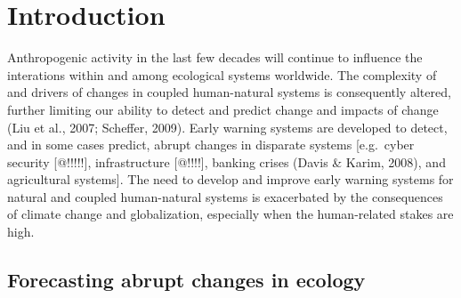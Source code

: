 \documentclass[12pt,twoside,openany]{reedthesis}
\begin{document}
\endgroup{}

\hypertarget{intro}{%
\chapter{Introduction}\label{intro}}

Anthropogenic activity in the last few decades will continue to influence the interations within and among ecological systems worldwide. The complexity of and drivers of changes in coupled human-natural systems is consequently altered, further limiting our ability to detect and predict change and impacts of change (Liu et al., 2007; Scheffer, 2009). Early warning systems are developed to detect, and in some cases predict, abrupt changes in disparate systems {[}e.g.~cyber security {[}@!!!!!{]}, infrastructure {[}@!!!!{]}, banking crises (Davis \& Karim, 2008), and agricultural systems{]}. The need to develop and improve early warning systems for natural and coupled human-natural systems is exacerbated by the consequences of climate change and globalization, especially when the human-related stakes are high.

\hypertarget{forecasting-abrupt-changes-in-ecology}{%
\section{Forecasting abrupt changes in ecology}\label{forecasting-abrupt-changes-in-ecology}}
\end{document}
